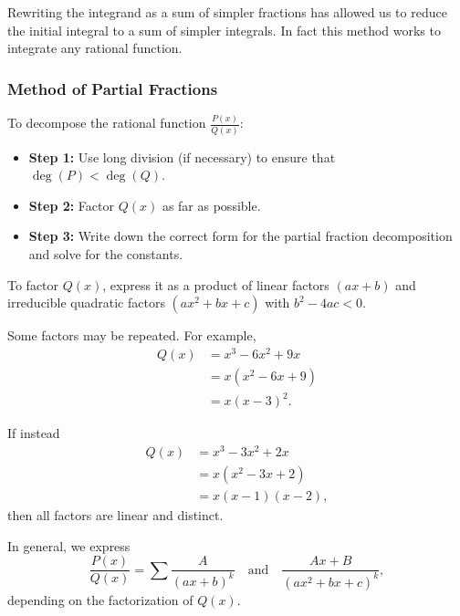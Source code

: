 Rewriting the integrand as a sum of simpler fractions has allowed us to reduce the initial integral to a sum of simpler integrals. In fact this method works to integrate any rational function.


\subsubsection{Method of Partial Fractions}
\label{sss:meth-ffe2}

To decompose the rational function $\frac{P(x)}{Q(x)}$:

\begin{itemize}
\item \textbf{Step 1:} Use long division (if necessary) to ensure that 
$\deg(P) < \deg(Q)$.
\item \textbf{Step 2:} Factor $Q(x)$ as far as possible.
\item \textbf{Step 3:} Write down the correct form for the partial fraction 
decomposition and solve for the constants.
\end{itemize}

\medskip

To factor $Q(x)$, express it as a product of linear factors $(ax+b)$ and 
irreducible quadratic factors $(ax^2+bx+c)$ with $b^2-4ac<0$.

\medskip

Some factors may be repeated. For example,
\begin{align}
Q(x) &= x^3 - 6x^2 + 9x \\
     &= x(x^2 - 6x + 9) \\
     &= x(x - 3)^2.
\end{align}

If instead
\begin{align}
Q(x) &= x^3 - 3x^2 + 2x \\
     &= x(x^2 - 3x + 2) \\
     &= x(x - 1)(x - 2),
\end{align}
then all factors are linear and distinct.

\medskip

In general, we express
\[
\frac{P(x)}{Q(x)} = 
\sum \frac{A}{(ax+b)^k} 
\quad \text{and} \quad
\frac{Ax+B}{(ax^2+bx+c)^k},
\]
depending on the factorization of $Q(x)$.

